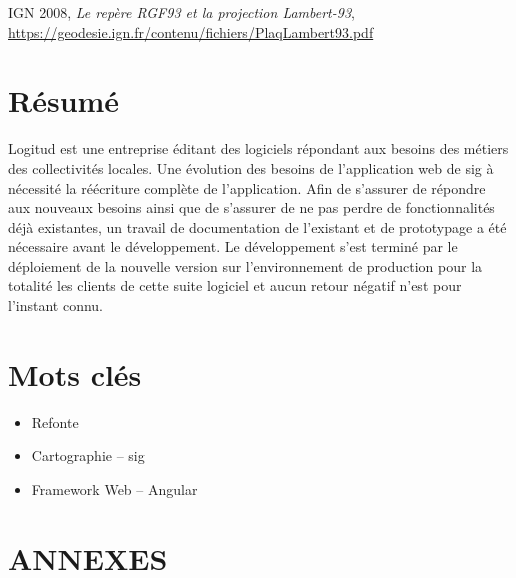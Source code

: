 \documentclass{rapportUHA40}
\begin{document}
\newpage
{}

\printglossaries{}
\begin{thebibliography}{9}
  IGN 2008, \emph{Le repère RGF93 et la projection Lambert-93}, \url{https://geodesie.ign.fr/contenu/fichiers/PlaqLambert93.pdf}
\end{thebibliography}
\newpage

\section*{Résumé}
\rhead{}

Logitud est une entreprise éditant des logiciels répondant aux besoins des
métiers des collectivités locales. Une évolution des besoins de l'application
web de \gls{sig} à nécessité la réécriture complète de l'application. Afin de
s'assurer de répondre aux nouveaux besoins ainsi que de s'assurer de ne pas
perdre de fonctionnalités déjà existantes, un travail de documentation de
l'existant et de prototypage a été nécessaire avant le développement. Le
développement s'est terminé par le déploiement de la nouvelle version sur
l'environnement de production pour la totalité les clients de cette suite
logiciel et aucun retour négatif n'est pour l'instant connu.

\section*{Mots clés}
\begin{itemize}
  \item Refonte
  \item Cartographie – \gls{sig}
  \item Framework Web – Angular
\end{itemize}

\clearpage
{}
\renewcommand{\thepage}{A-\arabic{page}}
\setcounter{page}{1}
\appendix
\section*{ANNEXES}
\end{document}
